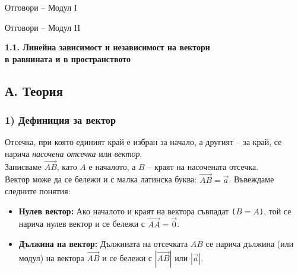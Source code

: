 \documentclass[12pt,a4paper]{article}
\newcommand{\vv}[1]{\overrightarrow{#1}}
\newcommand{\seclabel}{lesson11}
\newcommand{\qtag}[1]{\texttt{\color{greenaccent}\small#1}}
\begin{document}
{\vspace{0.3cm}
\noindent Отговори -- Модул I \par
\noindent Отговори -- Модул II 
}

\vspace{0.5cm}

\newpage

\label{\seclabel}

\begin{tcolorbox}[
    blanker,
    top=10pt, bottom=10pt,
    borderline architectural={1.5pt}{0pt}{tocgreen}
]
{\Large\bfseries\color{tocgreen!90!black} 1.1. Линейна зависимост и независимост на вектори\\ в равнината и в пространството}
\end{tcolorbox}
\vspace{-0.7cm}

\subsection*{А. Теория}

\subsubsection*{1) Дефиниция за вектор}

\begin{defbox}[Дефиниция 1]
Отсечка, при която единият край е избран за начало, а другият -- за край, се нарича \emph{насочена отсечка} или \emph{вектор}. \\ Записваме \qtag{$\vv{AB}$}, като $A$ е началото, а $B$ -- краят на насочената отсечка. \\ Вектор може да се бележи и с малка латинска буква: \qtag{$\vv{AB}=\vec{a}$}.
Въвеждаме следните понятия:
\begin{itemize}
    \vspace{-0.2cm}
    \item[\textbf{--}] \textbf{Нулев вектор:} Ако началото и краят на вектора съвпадат \qtag{($B=A$)}, той се нарича нулев вектор и се бележи с \qtag{$\vv{AA}=\vec{0}$}.
    \vspace{-0.2cm}
    \item[\textbf{--}] \textbf{Дължина на вектор:} Дължината на отсечката $AB$ се нарича дължина (или модул) на вектора $\vv{AB}$ и се бележи с \qtag{$|\vv{AB}|$} или \qtag{$|\vec{a}|$}.
\end{itemize}
\end{defbox}
\end{document}
